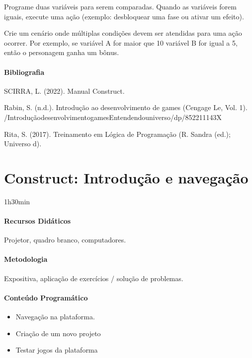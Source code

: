 \documentclass[letterpaper,10pt,brazil]{sphinxmanual}
\begin{document}
\sphinxAtStartPar
{}
Programe duas variáveis para serem comparadas.
Quando as variáveis forem iguais, execute uma ação (exemplo: desbloquear uma fase ou ativar um efeito).

\sphinxAtStartPar
{}
Crie um cenário onde múltiplas condições devem ser atendidas para uma ação ocorrer.
Por exemplo, se variável A for maior que 10  variável B for igual a 5, então o personagem ganha um bônus.
\subsubsection*{Bibliografia}

\sphinxAtStartPar
SCIRRA, L. (2022). Manual Construct.

\sphinxAtStartPar
Rabin, S. (n.d.). Introdução ao desenvolvimento de games (Cengage Le, Vol. 1).
/Introdução\sphinxhyphen{}desenvolvimento\sphinxhyphen{}games\sphinxhyphen{}Entendendo\sphinxhyphen{}universo/dp/852211143X

\sphinxAtStartPar
Rita, S. (2017). Treinamento em Lógica de Programação (R. Sandra (ed.); Universo d).

\sphinxstepscope


\chapter{Construct: Introdução e navegação}
\label{\detokenize{modelo_aula_06:construct-introducao-e-navegacao}}\label{\detokenize{modelo_aula_06::doc}}
\sphinxAtStartPar
{} 1h30min
\subsubsection*{Recursos Didáticos}

\sphinxAtStartPar
Projetor, quadro branco, computadores.
\subsubsection*{Metodologia}

\sphinxAtStartPar
Expositiva, aplicação de exercícios / solução de problemas.
\subsubsection*{Conteúdo Programático}
\begin{itemize}
\item {} 
\sphinxAtStartPar
Navegação na plataforma.

\item {} 
\sphinxAtStartPar
Criação de um novo projeto

\item {} 
\sphinxAtStartPar
Testar jogos da plataforma

\end{itemize}
\end{document}
